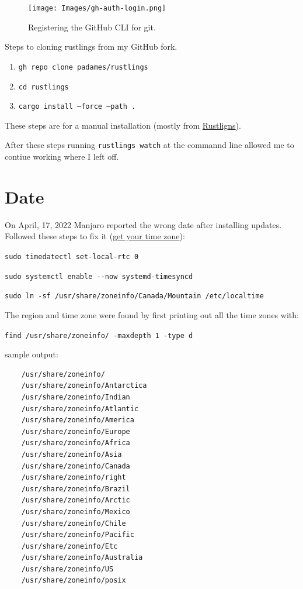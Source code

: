 \documentclass[]{scrartcl}
\begin{document}
\begin{figure}[!htb]
	\centering
	\caption{Registering the GitHub CLI for git.}
	\texttt{[image: Images/gh-auth-login.png]}
	\label{fig:github-auth-login}
\end{figure}


Steps to cloning rustlings from my GitHub fork.
\begin{enumerate}
	\item \texttt{gh repo clone padames/rustlings}
	\item \texttt{cd rustlings}
	\item \texttt{cargo install --force --path .}
\end{enumerate}

These steps are for a manual installation (mostly from \href{https://github.com/padames/rustlings?tab=readme-ov-file#manually}{Rustligns}).

After these steps running \texttt{rustlings watch} at the commannd line allowed me to contiue working where I left off.


\section{Date}

On April, 17, 2022 Manjaro reported the wrong date after installing updates.
Followed these steps to fix it (\href{https://archived.forum.manjaro.org/t/howto-get-your-time-timezone-right-using-manjaro-windows-dual-boot/89359}{get your time zone}):
\begin{compactenum}
	\item  \verb|sudo timedatectl set-local-rtc 0|
	\item \verb|sudo systemctl enable --now systemd-timesyncd|
	\item \verb|sudo ln -sf /usr/share/zoneinfo/Canada/Mountain /etc/localtime|
\end{compactenum}

The region and time zone were found by first printing out all the time zones with:

\verb|find /usr/share/zoneinfo/ -maxdepth 1 -type d|

sample output:

\begin{verbatim}
	/usr/share/zoneinfo/
	/usr/share/zoneinfo/Antarctica
	/usr/share/zoneinfo/Indian
	/usr/share/zoneinfo/Atlantic
	/usr/share/zoneinfo/America
	/usr/share/zoneinfo/Europe
	/usr/share/zoneinfo/Africa
	/usr/share/zoneinfo/Asia
	/usr/share/zoneinfo/Canada
	/usr/share/zoneinfo/right
	/usr/share/zoneinfo/Brazil
	/usr/share/zoneinfo/Arctic
	/usr/share/zoneinfo/Mexico
	/usr/share/zoneinfo/Chile
	/usr/share/zoneinfo/Pacific
	/usr/share/zoneinfo/Etc
	/usr/share/zoneinfo/Australia
	/usr/share/zoneinfo/US
	/usr/share/zoneinfo/posix
\end{verbatim}
\end{document}
